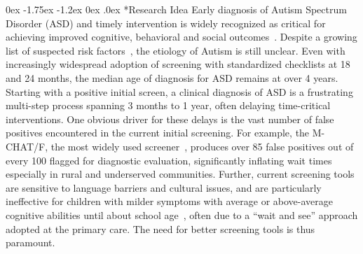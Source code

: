 \documentclass[onecolumn, compsoc,11pt]{IEEEtran}
\makeatletter
\renewcommand\section{\@startsection {section}{1}{\z@}%
                                   {-1pt \@plus -30ex \@minus 20ex}%
                                   {.1pt}%
                                   {\large\bfseries\scshape}}
\renewcommand\subsection{\@startsection {subsection}{2}{\z@}%
                                   {0ex \@plus -1.75ex \@minus -1.2ex}%
                                   {0ex \@plus.0ex}%
                                   {\fontsize{11}{11}\selectfont\bfseries\sffamily\color{black}}}
\makeatother
\begin{document}




\subsection*{Research Idea}
Early diagnosis of Autism Spectrum Disorder (ASD) and  timely  intervention is widely recognized as critical for achieving improved cognitive, behavioral and social outcomes~\cite{hyman2020identification}.
Despite  a growing list of suspected risk factors~\cite{kalb2012determinants,bisgaier2011access,fenikile2015barriers,pmid27565363}, the etiology of Autism is still unclear. Even with increasingly widespread adoption of screening with standardized checklists at 18 and 24 months, the median age of diagnosis for ASD remains at over 4 years.  Starting with a positive initial screen, a clinical diagnosis of ASD is  a  frustrating multi-step process spanning 3 months to 1 year, often delaying  time-critical interventions. One obvious driver for these delays  is the vast number of false positives encountered in the current initial  screening. For example, the  M-CHAT/F, the most widely used  screener~\cite{robins2014validation,hyman2020identification},  produces    over 85 false positives out of every 100   flagged for  diagnostic evaluation, significantly inflating wait times~\cite{pmid27565363} especially in rural and underserved communities.
Further, current  screening tools are sensitive to language barriers and cultural issues, and are  particularly ineffective for children with milder symptoms  with average or above-average cognitive abilities until about school age~\cite{jashar2016cognitive,hyman2020identification}, often due to a ``wait and see'' approach adopted at the primary care. The need for better screening tools is thus paramount.
\end{document}

